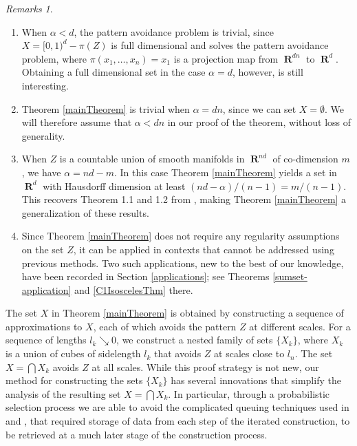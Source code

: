 \documentclass[dvipsnames,letterpaper,12pt]{article}
\numberwithin{equation}{section}
\theoremstyle{plain}
\theoremstyle{remark}
\newtheorem*{remarks}{Remarks}
\DeclareMathOperator{\RR}{\mathbf{R}}
\begin{document}
\begin{remarks}
	\
	\begin{enumerate}[1.]
		\item When $\alpha < d$, the pattern avoidance problem is trivial, since $X = [0,1)^d - \pi(Z)$ is full dimensional and solves the pattern avoidance problem, where $\pi(x_1, \dots, x_n) = x_1$ is a projection map from $\RR^{dn}$ to $\RR^d$. Obtaining a full dimensional set in the case $\alpha = d$, however, is still interesting.

		\item Theorem \ref{mainTheorem} is trivial when $\alpha = dn$, since we can set $X = \emptyset$. We will therefore assume that $\alpha < dn$ in our proof of the theorem, without loss of generality.

		\item When $Z$ is a countable union of smooth manifolds in $\RR^{nd}$ of co-dimension $m$, we have $\alpha = nd - m$. In this case Theorem \ref{mainTheorem} yields a set in $\RR^d$ with Hausdorff dimension at least $(nd - \alpha)/(n-1) = m/(n-1)$. This recovers Theorem 1.1 and 1.2 from \cite{MalabikaRob}, making Theorem \ref{mainTheorem} a generalization of these results.

		\item Since Theorem \ref{mainTheorem} does not require any regularity assumptions on the set $Z$, it can be applied in contexts that cannot be addressed using previous methods. Two such applications, new to the best of our knowledge, have been recorded in Section \ref{applications}; see Theorems \ref{sumset-application} and \ref{C1IsoscelesThm} there.
	\end{enumerate}
\end{remarks}

The set $X$ in Theorem \ref{mainTheorem} is obtained by constructing a sequence of approximations to $X$, each of which avoids the pattern $Z$ at different scales. For a sequence of lengths $l_k \searrow 0$, we construct a nested family of sets $\{X_k\}$, where $X_k$ is a union of cubes of sidelength $l_k$ that avoids $Z$ at scales close to $l_n$. The set $X=\bigcap X_k$ avoids $Z$ at all scales. While this proof strategy is not new, our method for constructing the sets $\{X_k\}$ has several innovations that simplify the analysis of the resulting set $X=\bigcap X_k$. In particular, through a probabilistic selection process we are able to avoid the complicated queuing techniques used in \cite{KeletiDimOneSet} and \cite{MalabikaRob}, that required storage of data from each step of the iterated construction, to be retrieved at a much later stage of the construction process.
\end{document}
